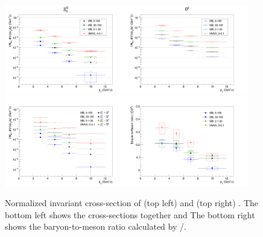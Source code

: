 \begin{figure}[h]
    \centering
    \includegraphics[width=0.95\textwidth]{plots/s3_Yield_INEL0.png}
    \includegraphics[width=0.95\textwidth]{plots/s3_Ratio_INEL0.png}
    \caption{Normalized invariant cross-section of \Xic (top left) and \Dzero (top right) \cite{ana993_D0}.
    The bottom left shows the cross-sections together and The bottom right shows the baryon-to-meson ratio calculated by \Xic/\Dzero.}
    \label{fig:s3_results}
\end{figure}

